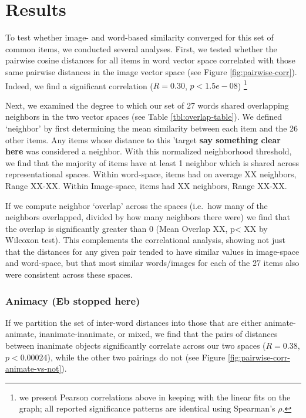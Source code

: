 \documentclass[10pt, letterpaper]{article}
\begin{document}
\section{Results}\label{results}

To test whether image- and word-based similarity converged for this set
of common items, we conducted several analyses. First, we tested whether
the pairwise cosine distances for all items in word vector space
correlated with those same pairwise distances in the image vector space
(see Figure \ref{fig:pairwise-corr}). Indeed, we find a significant
correlation (\(R = 0.30\), \(p < 1.5e-08\))
\footnote{we present Pearson correlations above in keeping with the linear fits on the graph; all reported significance patterns are identical using Spearman's $\rho$.}

Next, we examined the degree to which our set of 27 words shared
overlapping neighbors in the two vector spaces (see Table
\ref{tbl:overlap-table}). We defined `neighbor' by first determining the
mean similarity between each item and the 26 other items. Any items
whose distance to this 'target \textbf{say something clear here} was
considered a neighbor. With this normalized neighborhood threshold, we
find that the majority of items have at least 1 neighbor which is shared
across representational spaces. Within word-space, items had on average
XX neighbors, Range XX-XX. Within Image-space, items had XX neighbors,
Range XX-XX.

If we compute neighbor `overlap' across the spaces (i.e.~how many of the
neighbors overlapped, divided by how many neighbors there were) we find
that the overlap is significantly greater than 0 (Mean Overlap XX,
p\textless{} XX by Wilcoxon test). This complements the correlational
analysis, showing not just that the distances for any given pair tended
to have similar values in image-space and word-space, but that most
similar words/images for each of the 27 items also were consistent
across these spaces.

\subsubsection{Animacy (Eb stopped here)}\label{animacy-eb-stopped-here}

If we partition the set of inter-word distances into those that are
either animate-animate, inanimate-inanimate, or mixed, we find that the
pairs of distances between inanimate objects significantly correlate
across our two spaces (\(R = 0.38\), \(p < 0.00024\)), while the other
two pairings do not (see Figure \ref{fig:pairwise-corr-animate-vs-not}).
\end{document}
